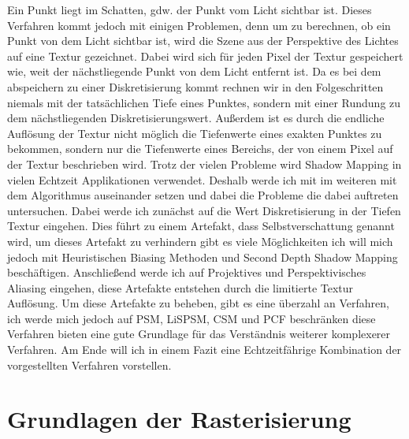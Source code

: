 Ein Punkt liegt im Schatten, gdw. der Punkt vom Licht sichtbar ist.
Dieses Verfahren kommt jedoch mit einigen Problemen, denn um zu berechnen, ob ein Punkt von dem Licht sichtbar ist,
wird die Szene aus der Perspektive des Lichtes auf eine Textur gezeichnet.
Dabei wird sich für jeden Pixel der Textur gespeichert wie, weit der nächstliegende Punkt von dem Licht entfernt ist.
Da es bei dem abspeichern zu einer Diskretisierung kommt rechnen 
wir in den Folgeschritten niemals mit der tatsächlichen Tiefe eines Punktes,
sondern mit einer Rundung zu dem nächstliegenden Diskretisierungswert.
Außerdem ist es durch die endliche Auflösung der Textur nicht möglich die Tiefenwerte eines exakten Punktes zu bekommen,
sondern nur die Tiefenwerte eines Bereichs, der von einem Pixel auf der Textur beschrieben wird.
\newline
\newline
Trotz der vielen Probleme wird Shadow Mapping in vielen Echtzeit Applikationen verwendet.
Deshalb werde ich mit im weiteren mit dem Algorithmus auseinander setzen und dabei die Probleme die dabei auftreten untersuchen.
Dabei werde ich zunächst auf die Wert Diskretisierung in der Tiefen Textur eingehen.
Dies führt zu einem Artefakt, dass Selbstverschattung genannt wird, um dieses Artefakt zu verhindern gibt es 
viele Möglichkeiten ich will mich jedoch mit Heuristischen Biasing Methoden und Second Depth Shadow Mapping beschäftigen.
Anschließend werde ich auf Projektives und Perspektivisches Aliasing eingehen, diese Artefakte entstehen durch 
die limitierte Textur Auflösung.
Um diese Artefakte zu beheben, gibt es eine überzahl an Verfahren, ich werde mich jedoch auf PSM, LiSPSM, CSM und PCF beschränken 
diese Verfahren bieten eine gute Grundlage für das Verständnis weiterer komplexerer Verfahren.
Am Ende will ich in einem Fazit eine Echtzeitfährige Kombination der vorgestellten Verfahren vorstellen.



\chapter{Grundlagen der Rasterisierung}
